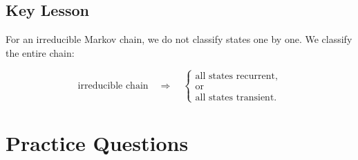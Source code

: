 \documentclass[12pt,a4paper]{article}
\theoremstyle{notestyle}
\begin{document}
\subsection{Key Lesson}

For an irreducible Markov chain, we do not classify states one by one. We classify the entire chain:

\[
\text{irreducible chain}
\quad\Longrightarrow\quad
\begin{cases}
\text{all states recurrent},\\
\text{or}\\
\text{all states transient}.
\end{cases}
\]

\section{Practice Questions}
\end{document}
